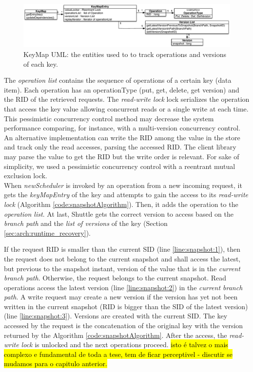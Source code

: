 \begin{figure}
  \centering
  \includegraphics[width=\textwidth]{arch/keymap}
  \caption{KeyMap UML: the entities used to to track operations and versions of each key.}
  \label{fig:keymap}
\end{figure}


The \emph{operation list} contains the sequence of operations of a certain key (data item). Each operation has an operationType (put, get, delete, get version) and the \ac{RID} of the retrieved requests. The \emph{read-write lock} lock serializes the operation that access the key value allowing concurrent reads or a single write at each time. This pessimistic concurrency control method may decrease the system performance comparing, for instance, with a multi-version concurrency control. An alternative implementation can write the \ac{RID} among the value in the store and track only the read accesses, parsing the accessed \ac{RID}. The client library may parse the value to get the \ac{RID} but the write order is relevant. For sake of simplicity, we used a pessimistic concurrency control with a reentrant mutual exclusion lock.\\

When \emph{newScheduler} is invoked by an operation from a new incoming request, it gets the \emph{keyMapEntry} of the key and attempts to gain the access to its \emph{read-write lock} (Algorithm \ref{code:snapshotAlgorithm}). Then, it adds the operation to the \emph{operation list}. At last, Shuttle gets the correct version to access based on the \emph{branch path} and the \emph{list of versions} of the key (Section \ref{sec:arch:runtime_recovery}). 

If the request \ac{RID} is smaller than the current \acf{SID} (line \ref{line:snapshot:1}), then the request does not belong to the current snapshot and shall access the latest, but previous to the snapshot instant, version of the value that is in the  \textit{current branch path}. Otherwise, the request belongs to the current snapshot. Read operations access the latest version (line \ref{line:snapshot:2}) in the  \textit{current branch path}. A write request may create a new version if the version has yet not been written in the current snapshot (\ac{RID} is bigger than the \ac{SID} of the latest version) (line \ref{line:snapshot:3}). Versions are created with the current \acf{SID}. The key accessed by the request is the concatenation of the original key with the version returned by the Algorithm \ref{code:snapshotAlgorithm}. After the access, the \emph{read-write lock} is unlocked and the next operations proceed. \hl{isto é talvez o mais complexo e fundamental de toda a tese, tem de ficar perceptivel - discutir se mudamos para o capitulo anterior.} 


